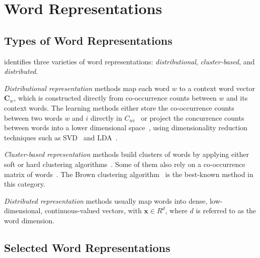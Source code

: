 \section{Word Representations}
\label{wordrep} 

\subsection{Types of Word Representations}

 identifies three varieties of word
representations: \textit{distributional}, \textit{cluster-based}, and
\textit{distributed}.

\textit{Distributional representation} methods map each word $w$ to a
context word vector $\mathbf{C}_w$, which is constructed directly from
co-occurrence counts between $w$ and its context words.  The learning
methods either store the co-occurrence counts between two words $w$ and
$i$ directly in
$C_{wi}$~\cite{sahlgren2006word,turney2010frequency,honkela1997self} or
project the concurrence counts between words into a lower dimensional
space~\cite{vrehuuvrek2010software,lund1996producing}, using
dimensionality reduction techniques such as SVD~\cite{dumais1988using} and
LDA~\cite{blei2003latent}.

\textit{Cluster-based representation} methods build clusters of words by applying either soft or hard clustering algorithms~\cite{lin2009phrase,li2005semi}. Some of them also rely on a co-occurrence matrix of words~\cite{pereira1993distributional}. The Brown clustering algorithm~\cite{Brown92class-basedn-gram} is the best-known method in this category.

\textit{Distributed representation} methods usually map words into dense,
low-dimensional, continuous-valued vectors, with $\mathbf{x} \in
R^d$, where $d$ is referred to as the word dimension.

\subsection{Selected Word Representations}

